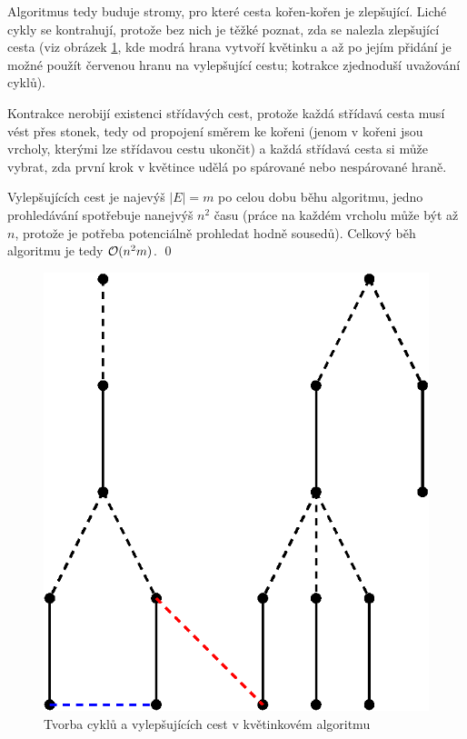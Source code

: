 Algoritmus tedy buduje stromy, pro které cesta kořen-kořen je zlepšující. Liché
cykly se kontrahují, protože bez nich je těžké poznat, zda se nalezla zlepšující
cesta (viz obrázek \ref{blossoms}, kde modrá hrana vytvoří květinku a až po
jejím přidání je možné použít červenou hranu na vylepšující cestu; kotrakce
zjednoduší uvažování cyklů).

Kontrakce nerobijí existenci střídavých cest, protože každá střídavá cesta musí
vést přes stonek, tedy od propojení směrem ke kořeni (jenom v kořeni jsou
vrcholy, kterými lze střídavou cestu ukončit) a každá střídavá cesta si může
vybrat, zda první krok v květince udělá po spárované nebo nespárované hraně.

Vylepšujících cest je najevýš $|E| = m$ po celou dobu běhu algoritmu, jedno
prohledávání spotřebuje nanejvýš $n^2$ času (práce na každém vrcholu může být až
$n$, protože je potřeba potenciálně prohledat hodně sousedů). Celkový běh
algoritmu je tedy $\mathcal{O}(n^2m)$. \qed

\begin{figure}[h!]
	\centering
	\includegraphics{img/blossoms.eps}
	\caption{Tvorba cyklů a vylepšujících cest v květinkovém algoritmu}
	\label{blossoms}
\end{figure}

